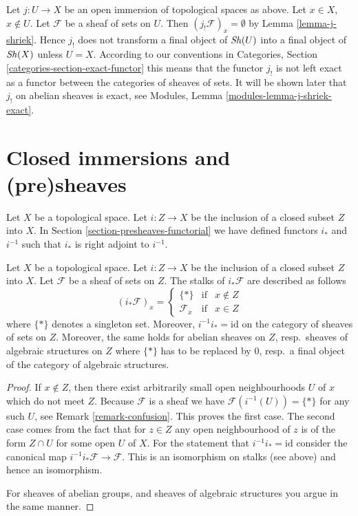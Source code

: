 \begin{remark}
\label{remark-j-shriek-not-exact}
Let $j : U \to X$ be an open immersion of topological spaces as above.
Let $x \in X$, $x \not \in U$. Let $\mathcal{F}$ be a sheaf of sets
on $U$. Then $(j_!\mathcal{F})_x = \emptyset$ by Lemma \ref{lemma-j-shriek}.
Hence $j_!$ does not transform a final object of $\mathop{\mathit{Sh}}\nolimits(U)$
into a final object of $\mathop{\mathit{Sh}}\nolimits(X)$ unless $U = X$.
According to our conventions in
Categories, Section \ref{categories-section-exact-functor}
this means that the functor $j_!$ is not left exact
as a functor between the categories of sheaves of sets.
It will be shown later that $j_!$ on abelian sheaves is exact,
see Modules, Lemma \ref{modules-lemma-j-shriek-exact}.
\end{remark}








\section{Closed immersions and (pre)sheaves}
\label{section-closed-immersions}

\noindent
Let $X$ be a topological space.
Let $i : Z \to X$ be the inclusion of a closed subset $Z$ into $X$.
In Section \ref{section-presheaves-functorial} we have defined
functors $i_*$ and $i^{-1}$ such that $i_*$ is right adjoint to
$i^{-1}$.

\begin{lemma}
\label{lemma-stalks-closed-pushforward}
Let $X$ be a topological space.
Let $i : Z \to X$ be the inclusion of a closed subset $Z$ into $X$.
Let $\mathcal{F}$ be a sheaf of sets on $Z$.
The stalks of $i_*\mathcal{F}$ are described as follows
$$
(i_*\mathcal{F})_x =
\left\{
\begin{matrix}
\{*\} & \text{if} & x \not \in Z \\
\mathcal{F}_x & \text{if} & x \in Z
\end{matrix}
\right.
$$
where $\{*\}$ denotes a singleton set. Moreover,
$i^{-1}i_* = \text{id}$ on the category of sheaves
of sets on $Z$. Moreover, the same holds for abelian
sheaves on $Z$, resp.\ sheaves of algebraic structures on $Z$
where $\{*\}$ has to be replaced by $0$, resp.\ a
final object of the category of algebraic structures.
\end{lemma}

\begin{proof}
If $x \not \in Z$, then there exist arbitrarily small open
neighbourhoods $U$ of $x$ which do not meet $Z$.
Because $\mathcal{F}$ is a sheaf
we have $\mathcal{F}(i^{-1}(U)) = \{*\}$ for any such $U$,
see Remark \ref{remark-confusion}. This proves the first case.
The second case comes from the fact that for $z \in Z$
any open neighbourhood of $z$ is of the form $Z \cap U$ for
some open $U$ of $X$. For the statement that
$i^{-1}i_* = \text{id}$ consider the canonical map
$i^{-1}i_*\mathcal{F} \to \mathcal{F}$. This is an isomorphism
on stalks (see above) and hence an isomorphism.

\medskip\noindent
For sheaves of abelian groups, and sheaves of algebraic structures
you argue in the same manner.
\end{proof}


